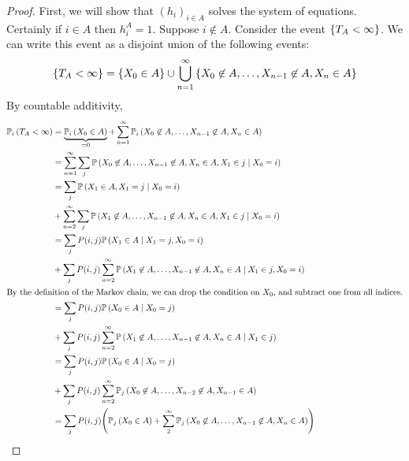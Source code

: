 \begin{proof}
	First, we will show that \( (h_i)_{i \in A} \) solves the system of equations.
	Certainly if \( i \in A \) then \( h_i^A = 1 \).
	Suppose \( i \not\in A \).
	Consider the event \( \qty{T_A < \infty} \).
	We can write this event as a disjoint union of the following events:
	\[
		\qty{T_A < \infty} = \qty{X_0 \in A} \cup \bigcup_{n=1}^\infty \qty{X_0 \not\in A, \dots, X_{n-1} \not\in A, X_n \in A}
	\]
	By countable additivity,
	\begin{align*}
		\psub{i}{T_A < \infty} & = \underbrace{\psub{i}{X_0 \in A}}_{=0} + \sum_{n=1}^\infty \psub{i}{X_0 \not\in A, \dots, X_{n-1} \not\in A, X_n \in A}   \\
		                       & = \sum_{n=1}^\infty \sum_j \prob{X_0 \not\in A, \dots, X_{n-1} \not\in A, X_n \in A, X_1 \in j \mid X_0 = i}               \\
		                       & = \sum_j \prob{X_1 \in A, X_1 = j \mid X_0 = i}                                                                            \\
		                       & + \sum_{n=2}^\infty \sum_j \prob{X_1 \not\in A, \dots, X_{n-1} \not\in A, X_n \in A, X_1 \in j \mid X_0 = i}               \\
		                       & = \sum_j P(i,j) \prob{X_1 \in A \mid X_1 = j, X_0 = i}                                                                     \\
		                       & + \sum_j P(i,j) \sum_{n=2}^\infty \prob{X_1 \not\in A, \dots, X_{n-1} \not\in A, X_n \in A \mid X_1 \in j, X_0 = i}        \\
		\intertext{By the definition of the Markov chain, we can drop the condition on \( X_0 \), and subtract one from all indices.}
		                       & = \sum_j P(i,j) \prob{X_0 \in A \mid X_0 = j}                                                                              \\
		                       & + \sum_j P(i,j) \sum_{n=2}^\infty \prob{X_1 \not\in A, \dots, X_{n-1} \not\in A, X_n \in A \mid X_1 \in j}                 \\
		                       & = \sum_j P(i,j) \prob{X_0 \in A \mid X_0 = j}                                                                              \\
		                       & + \sum_j P(i,j) \sum_{n=2}^\infty \psub{j}{X_0 \not\in A, \dots, X_{n-2} \not\in A, X_{n-1} \in A}                         \\
		                       & = \sum_j P(i,j) \qty( \psub{j}{X_0 \in A} + \sum_{2}^\infty \psub{j}{X_0 \not\in A, \dots, X_{n-1} \not\in A, X_n \in A} ) \\

\end{align*}
\end{proof}
